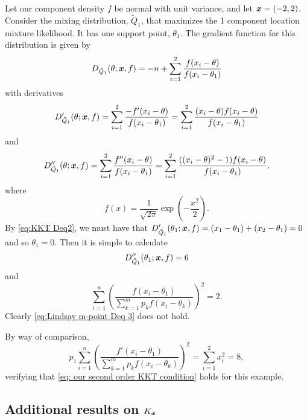 	Let our component density $f$ be normal with unit variance, and let ${\bm{{x}}} = (-2,2)$. Consider the mixing distribution, $\tilde{Q}_1$, that maximizes the 1 component location mixture likelihood. It has one support point, $\theta_1$. The gradient function for this distribution is given by
	\begin{equation}
		D_{\tilde{Q}_1}(\theta;{\bm{{x}}}, f) = -n + \sum_{i = 1}^2 \frac{f(x_i - \theta)}{f(x_i - \theta_1)}
	\end{equation}
	with derivatives
	\begin{equation}
		D_{\tilde{Q}_1}'(\theta;{\bm{{x}}}, f) = \sum_{i = 1}^2 \frac{-f'(x_i - \theta)}{f(x_i - \theta_1)} = \sum_{i = 1}^2 \frac{(x_i - \theta) f(x_i - \theta)}{f(x_i - \theta_1)}
	\end{equation}
	and
	\begin{equation}
		D_{\tilde{Q}_1}''(\theta;{\bm{{x}}}, f) = \sum_{i = 1}^2 \frac{f''(x_i - \theta)}{f(x_i - \theta_1)} = \sum_{i = 1}^2 \frac{((x_i - \theta)^2 - 1)f(x_i - \theta)}{f(x_i - \theta_1)},
	\end{equation}
	where
	\begin{equation}
		f(x) = \frac{1}{\sqrt{2 \pi}} \exp\left(-\frac{x^2}{2}\right).
	\end{equation}
	By \eqref{eq:KKT Deq2}, we must have that $D'_{\tilde{Q}_1}(\theta_1;{\bm{{x}}}, f) = (x_1 - \theta_1) + (x_2 - \theta_1) = 0$ and so $\theta_1 = 0$. Then it is simple to calculate
	\begin{equation}
		D_{\tilde{Q}_1}''(\theta_1;{\bm{{x}}}, f) = 6
	\end{equation}
	and
	\begin{equation}
		\sum_{i = 1}^n \left(\frac{f(x_i - \theta_1)}{\sum_{k = 1}^m p_k f(x_i - \theta_k)}\right)^2 = 2.
	\end{equation}
	Clearly \eqref{eq:Lindsay m-point Deq 3} does not hold. 

	By way of comparison, 
	\begin{equation}
		p_1 \sum_{i = 1}^n \left(\frac{f'(x_i - \theta_1)}{\sum_{k = 1}^m p_k f(x_i - \theta_k)}\right)^2 = \sum_{i = 1}^2 x_i^2 = 8,
	\end{equation}
	verifying that \eqref{eq: our second order KKT condition} holds for this example.


	\subsection{Additional results on \texorpdfstring{$K_{\bm{{x}}}$}{Kx}}

